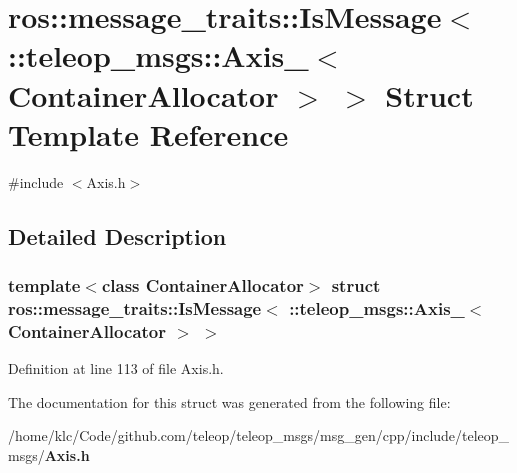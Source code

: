 \section{ros::message\_\-traits::IsMessage$<$ ::teleop\_\-msgs::Axis\_\-$<$ ContainerAllocator $>$ $>$ Struct Template Reference}
\label{structros_1_1message__traits_1_1IsMessage_3_01_1_1teleop__msgs_1_1Axis___3_01ContainerAllocator_01_4_01_4}


{\ttfamily \#include $<$Axis.h$>$}



\subsection{Detailed Description}
\subsubsection*{template$<$class ContainerAllocator$>$ struct ros::message\_\-traits::IsMessage$<$ ::teleop\_\-msgs::Axis\_\-$<$ ContainerAllocator $>$ $>$}



Definition at line 113 of file Axis.h.



The documentation for this struct was generated from the following file:\begin{DoxyCompactItemize}
\item 
/home/klc/Code/github.com/teleop/teleop\_\-msgs/msg\_\-gen/cpp/include/teleop\_\-msgs/{\bf Axis.h}\end{DoxyCompactItemize}
